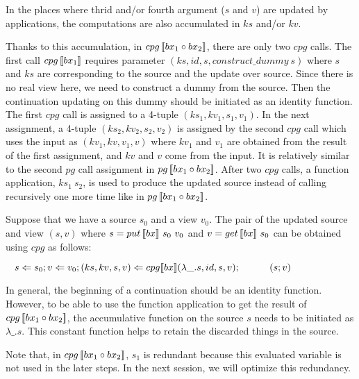 In the places where thrid and/or fourth argument ($s$ and $v$) are updated by applications, the computations are also accumulated in $ks$ and/or $kv$.


Thanks to this accumulation, in $cpg \, [\![bx_1 \circ bx_2]\!]$, there are only two $cpg$ calls. The first call $cpg \, [\![bx_1]\!]$ requires parameter $(ks, id, s, construct\_dummy \ s)$ where $s$ and $ks$ are corresponding to the source and the update over source. Since there is no real view here, we need to construct a dummy from the source. Then the continuation updating on this dummy should be initiated as an identity function. The first $cpg$ call is assigned to a 4-tuple $(ks_1, kv_1, s_1, v_1)$. In the next assignment, a 4-tuple $(ks_2, kv_2, s_2, v_2)$ is assigned by the second $cpg$ call which uses the input as $(kv_1, kv, v_1, v)$ where $kv_1$ and $v_1$ are obtained from the result of the first assignment, and $kv$ and $v$ come from the input. It is relatively similar to the second $pg$ call assignment in $pg \, [\![bx_1 \circ bx_2]\!]$. After two $cpg$ calls, a function application, $ks_1 \ s_2$, is used to produce the updated source instead of calling recursively one more time like in $pg \, [\![bx_1 \circ bx_2]\!]$.

Suppose that we have a source $s_0$ and a view $v_0$. The pair of the updated source and view $(s, v)$ where $s = put \, [\![bx]\!] \ s_0 \ v_0$ and $v = get \, [\![bx]\!] \ s_0$ can be obtained using $cpg$ as follows:

    $\tab s \Leftarrow s_0; v \Leftarrow v_0; (ks, kv, s, v) \Leftarrow \cpg{bx}{\lambda \_.s}{id}{s}{v};\\
        \tab \qtab (s; v)$

        In general, the beginning of a continuation should be an identity function. However, to be able to use the function application to get the result of $cpg \, [\![bx_1 \circ bx_2]\!]$, the accumulative function on the source $s$ needs to be initiated as $\lambda \_.s$. This constant function helps to retain the discarded things in the source.



        Note that, in $cpg \, [\![bx_1 \circ bx_2]\!]$, $s_1$ is redundant because this evaluated variable is not used in the later steps.
        In the next session, we will optimize this redundancy.

